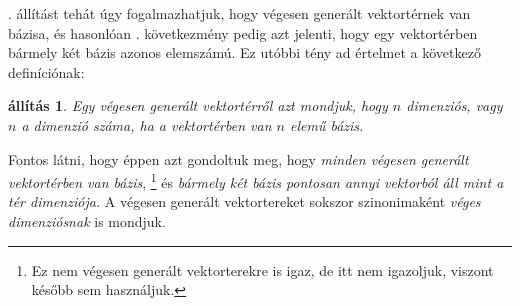 \documentclass[9pt, a4paper, showtrims]{memoir}
\let\Aref\relax
\theoremstyle{plain}
\newtheorem{proposition}{állítás}[chapter]
\theoremstyle{remark}
\theoremstyle{definition}
\begin{document}
\Aref{pr:bazisletezik}. állítást tehát úgy fogalmazhatjuk, hogy végesen generált vektortérnek van bázisa,
és hasonlóan . következmény pedig azt jelenti, 
hogy egy vektortérben bármely két bázis azonos elemszámú.
Ez utóbbi tény ad értelmet a következő definíciónak:
\begin{proposition}
    Egy végesen generált vektortérről azt mondjuk, hogy $n$ dimenziós, vagy $n$ a dimenzió száma,
    ha a vektortérben van $n$ elemű bázis.
\end{proposition}
Fontos látni, hogy éppen azt gondoltuk meg, hogy \emph{minden végesen generált vektortérben van bázis}, 
\footnote{Ez nem végesen generált vektorterekre is igaz, de itt nem igazoljuk, 
viszont később sem használjuk.}
és \emph{bármely két bázis pontosan annyi vektorból áll mint a tér dimenziója.}
A végesen generált vektortereket sokszor szinonimaként \emph{véges dimenziósnak} is mondjuk.
\end{document}
